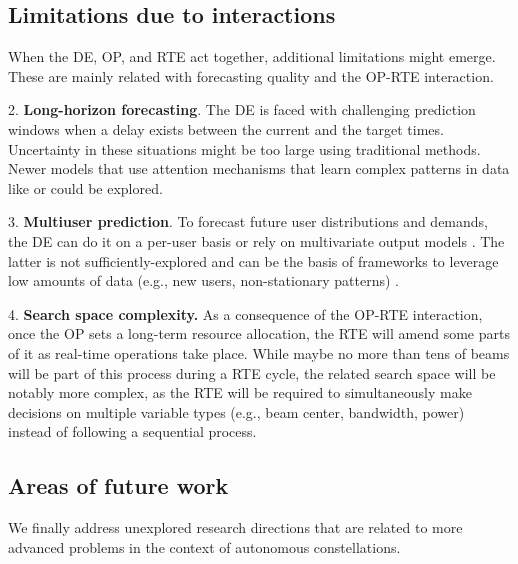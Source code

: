 \documentclass[letterpaper]{article} %
\begin{document}
\subsection{Limitations due to interactions}
When the DE, OP, and RTE act together, additional limitations might emerge. These are mainly related with forecasting quality and the OP-RTE interaction.
\begin{itemize}
2. \textbf{Long-horizon forecasting}. The DE is faced with challenging prediction windows when a delay exists between the current and the target times. Uncertainty in these situations might be too large using traditional methods. Newer models that use attention mechanisms that learn complex patterns in data like \cite{Li2019} or \cite{Wu2020DeepCase} could be explored.

3. \textbf{Multiuser prediction}. To forecast future user distributions and demands, the DE can do it on a per-user basis or rely on multivariate output models \cite{CharkrabortyKishanMehrotra1990ForecastingNetworks, Wan2019MultivariateForecasting}. The latter is not sufficiently-explored and can be the basis of frameworks to leverage low amounts of data (e.g., new users, non-stationary patterns) \cite{Yu2016TemporalPrediction}.

4. \textbf{Search space complexity.} As a consequence of the OP-RTE interaction, once the OP sets a long-term resource allocation, the RTE will amend some parts of it as real-time operations take place. While maybe no more than tens of beams will be part of this process during a RTE cycle, the related search space will be notably more complex, as the RTE will be required to simultaneously make decisions on multiple variable types (e.g., beam center, bandwidth, power) instead of following a sequential process.

\end{itemize}


\subsection{Areas of future work}
We finally address unexplored research directions that are related to more advanced problems in the context of autonomous constellations.
\end{document}
